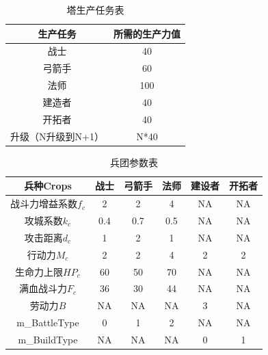 \documentclass[a4paper,4pt]{article}
\begin{document}
\begin{table}[htbp]
  \centering
  \caption{塔生产任务表}
  \begin{tabular}{c|c}
    \hline
    生产任务           & 所需的生产力值 \bigstrut \\
    \hline
    战士               & 40 \bigstrut             \\
    \hline
    弓箭手             & 60 \bigstrut             \\
    \hline
    法师               & 100 \bigstrut            \\
    \hline
    建造者             & 40 \bigstrut             \\
    \hline
    开拓者             & 40 \bigstrut             \\
    \hline
    升级（N升级到N+1） & N*40 \bigstrut           \\
    \hline
  \end{tabular}%
  \label{塔生产}%
\end{table}%

\begin{table}[htbp]
  \centering
  \caption{兵团参数表}
  \begin{tabular}{c|c|c|c|c|c}
    \hline
    兵种Crops           & 战士 & 弓箭手 & 法师 & 建设者 & 开拓者 \bigstrut \\
    \hline
    战斗力增益系数$f_c$ & 2    & 2      & 4    & NA     & NA \bigstrut     \\
    \hline
    攻城系数$k_c$       & 0.4  & 0.7    & 0.5  & NA     & NA \bigstrut     \\
    \hline
    攻击距离$d_c$       & 1    & 2      & 1    & NA     & NA \bigstrut     \\
    \hline
    行动力$M_c$         & 2    & 2      & 4    & 2      & 2 \bigstrut      \\
    \hline
    生命力上限$HP_c$    & 60   & 50     & 70   & NA     & NA \bigstrut     \\
    \hline
    满血战斗力$F_c$     & 36   & 30     & 44   & NA     & NA \bigstrut     \\
    \hline
    劳动力$B$           & NA   & NA     & NA   & 3      & NA \bigstrut     \\
    \hline
    m\_BattleType       & 0    & 1      & 2    & NA     & NA \bigstrut     \\
    \hline
    m\_BuildType        & NA   & NA     & NA   & 0      & 1 \bigstrut      \\
    \hline
  \end{tabular}%
  \label{兵团}%
\end{table}%
\end{document}
